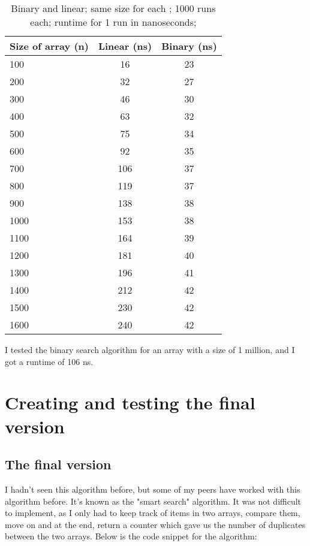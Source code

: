\documentclass[a4paper,11pt]{article}
\begin{document}
\begin{table}[h]
\begin{center}
\begin{tabular}{l|c|c}
\textbf{Size of array (n)} & \textbf{Linear (ns)} & \textbf{ Binary (ns)}\\
\hline
  100     &  16 &     23\\
  200     &  32 &     27\\
  300     &  46 &     30\\
  400     &  63 &     32\\
  500     &  75 &     34\\
  600     &  92 &     35\\
  700     &  106 &     37\\
  800    &  119 &     37\\
  900    &  138 &     38\\
  1000     &  153 &     38\\
  1100     &  164 &     39\\
  1200     &  181 &     40\\
  1300     &  196 &     41\\
  1400     &  212 &     42\\
  1500     &  230 &     42\\
  1600     &  240 &     42\\
\end{tabular}
\caption{Binary and linear; same size for each ; 1000 runs each;  runtime for 1 run in nanoseconds;}
\label{tab:table}
\end{center}
\end{table}

I tested the binary search algorithm for an array with a size of 1 million, and I got a runtime of 106 ns.



\section*{Creating and testing the final version}

\subsection*{The final version}
I hadn't seen this algorithm before, but some of my peers have worked with this algorithm before. It's known as the "smart search" algorithm. It was not difficult to implement, as I only had to keep track of items in two arrays, compare them, move on and at the end, return a counter which gave us the number of duplicates between the two arrays. Below is the code snippet for the algorithm:
\end{document}
